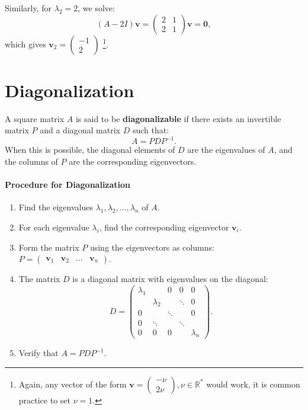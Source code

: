 \documentclass[]{article}
\newcommand{\R}{\mathbb{R}}
\begin{document}
	Similarly, for $ \lambda_2 = 2 $, we solve:
	$$
	(A - 2I)\mathbf{v} = \begin{pmatrix}
		2 & 1 \\
		2 & 1
	\end{pmatrix} \mathbf{v} = \mathbf{0},
	$$
	which gives $\mathbf{v}_2 = \begin{pmatrix} -1 \\ 2 \end{pmatrix}$ 	\footnote{Again, any vector of the form $\mathbf{v} = \begin{pmatrix} -\nu \\ 2\nu \end{pmatrix}, \nu \in \R^*$ would work, it is common practice to set $\nu=1$.}.
	
	\section{Diagonalization}
	
	A square matrix $A$ is said to be \textbf{diagonalizable} if there exists an invertible matrix $P$ and a diagonal matrix $D$ such that:
	$$
	A = PDP^{-1}.
	$$
	When this is possible, the diagonal elements of $D$ are the eigenvalues of $A$, and the columns of $P$ are the corresponding eigenvectors.
	
	\paragraph{Procedure for Diagonalization}
	
	\begin{enumerate}
		\item Find the eigenvalues $\lambda_1, \lambda_2, \ldots, \lambda_n$ of $A$.
		\item For each eigenvalue $\lambda_i$, find the corresponding eigenvector $\mathbf{v}_i$.
		\item Form the matrix $P$ using the eigenvectors as columns: $P = \begin{pmatrix} \mathbf{v}_1 & \mathbf{v}_2 & \ldots & \mathbf{v}_n \end{pmatrix}$.
		\item The matrix $D$ is a diagonal matrix with eigenvalues on the diagonal:
		$$
		D =
		\begin{pmatrix}
			\lambda_1 & & 0 & 0 & 0 \\
			 & \lambda_2 & & \ddots & 0 \\
			0 & & \ddots & & 0 \\
			0 & \ddots & & \ddots &  \\
			0 & 0 & 0 & & \lambda_n
		\end{pmatrix}.
		$$
		\item Verify that $A = PDP^{-1}$.
	\end{enumerate}
	
\end{document}
